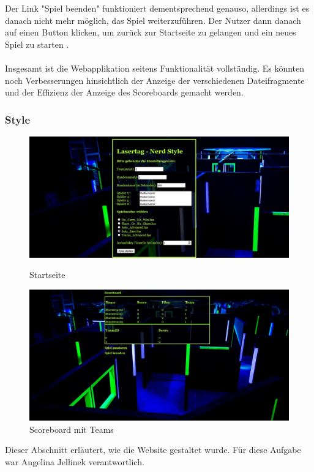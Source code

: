 Der Link "Spiel beenden" funktioniert dementsprechend genauso, allerdings ist es danach nicht mehr möglich, das Spiel weiterzuführen. Der Nutzer dann danach auf einen Button klicken, um zurück zur Startseite zu gelangen und ein neues Spiel zu starten .\\\\
Insgesamt ist die Webapplikation seitens Funktionalität vollständig. Es könnten noch Verbesserungen hinsichtlich der Anzeige der verschiedenen Dateifragmente und der Effizienz der Anzeige des Scoreboards gemacht werden.


\subsubsection{Style}

\begin{figure}[htb]
	\begin{center}
		\includegraphics[width=0.75 \textwidth]{websitemenue.JPG}
		\caption{Startseite}
		\label{fig:start}
	\end{center}
\begin{center}
	\includegraphics[width=0.75 \textwidth]{scoreboardteams.JPG}
	\caption{Scoreboard mit Teams}
	\label{fig:team}
\end{center}
\end{figure}
	
Dieser Abschnitt erläutert, wie die Website gestaltet wurde. Für diese Aufgabe war Angelina Jellinek verantwortlich.

